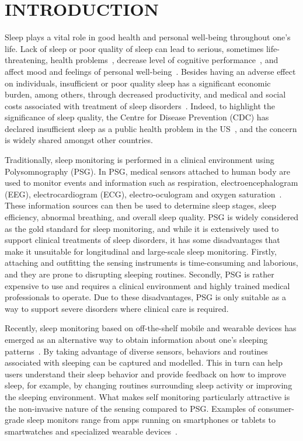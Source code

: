 \section{INTRODUCTION}\label{sec:1introduction}

Sleep plays a vital role in good health and personal well-being throughout one's life. Lack of sleep or poor quality of sleep can lead to
serious, sometimes life-threatening, health problems~\cite{altena2008sleep,chandola2010effect,lallukka2016contribution}, decrease level of
cognitive performance~\cite{alhola07sleep,akerstedt07altered}, and affect mood and feelings of personal
well-being~\cite{paunio09longitudinal,pilcher97sleep}. Besides having an adverse effect on individuals, insufficient or poor quality sleep
has a significant economic burden, among others, through decreased productivity, and medical and social costs associated with treatment of
sleep disorders~\cite{hafner17why}. Indeed, to highlight the significance of sleep quality, the Centre for Disease Prevention (CDC) has
declared insufficient sleep as a public health problem in the US~\cite{sleepreport}, and the concern is widely shared amongst other
 countries.


Traditionally, sleep monitoring is performed in a clinical environment using Polysomnography (PSG). In PSG, medical
sensors attached to human body are used to monitor events and information such as respiration, electroencephalogram (EEG), electrocardiogram (ECG), electro-oculogram and oxygen saturation~\cite{ebrahimi2008automatic,saper2005hypothalamic,oropesa1999sleep,langkvist2012sleep}. These information sources can then be used to determine sleep stages, sleep efficiency, abnormal breathing, and overall sleep quality. PSG is widely considered as the gold standard for sleep monitoring, and while it is extensively used to support clinical treatments of sleep disorders, it has some disadvantages that make it unsuitable for longitudinal and large-scale sleep monitoring. Firstly, {attaching and outfitting} the sensing instruments is time-consuming and laborious, and they are prone to disrupting sleeping routines. Secondly, PSG is rather expensive to use and requires a clinical environment and highly trained medical professionals to operate. Due to these disadvantages, PSG is only suitable as a way to support severe disorders {where} clinical care is required.

Recently, sleep monitoring based on off-the-shelf mobile and wearable devices has emerged as an alternative way to obtain information about one's sleeping patterns~\cite{ko15consumer,shelgikar2016sleep}. By taking advantage of diverse sensors, behaviors and routines associated with sleeping can be captured and modelled. This in turn can help users understand their sleep behavior and provide feedback on how to improve sleep, for example, by changing routines surrounding sleep activity or improving the sleeping environment. What makes self monitoring particularly attractive is the non-invasive nature of the sensing compared to PSG. Examples of consumer-grade sleep monitors range from apps running on smartphones or tablets to smartwatches and specialized wearable devices~\cite{zeo,Jawbone,SleepAndroid,fitbit,gu2016sleep,sleepmonitor}.

